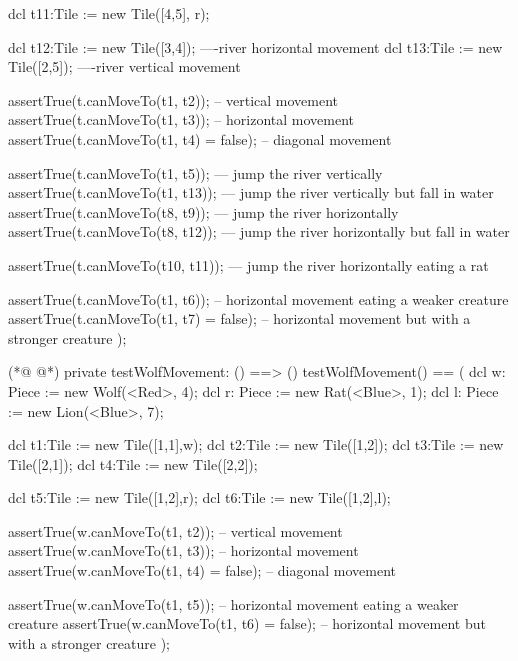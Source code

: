 \begin{vdmpp}[breaklines=true]
             dcl t11:Tile := new Tile([4,5], r);
             
             dcl t12:Tile := new Tile([3,4]); ----river horizontal movement
             dcl t13:Tile := new Tile([2,5]); ----river vertical movement
             
             
             assertTrue(t.canMoveTo(t1, t2)); -- vertical movement
             assertTrue(t.canMoveTo(t1, t3)); -- horizontal movement
             assertTrue(t.canMoveTo(t1, t4) = false); -- diagonal movement
             
             assertTrue(t.canMoveTo(t1, t5)); --- jump the river vertically
             assertTrue(t.canMoveTo(t1, t13)); --- jump the river vertically but fall in water
             assertTrue(t.canMoveTo(t8, t9)); --- jump the river horizontally
             assertTrue(t.canMoveTo(t8, t12)); --- jump the river horizontally but fall in water
             
             assertTrue(t.canMoveTo(t10, t11)); --- jump the river horizontally eating a rat
             
             assertTrue(t.canMoveTo(t1, t6)); -- horizontal movement eating a weaker creature
             assertTrue(t.canMoveTo(t1, t7) = false); -- horizontal movement but with a stronger creature
  );
  
(*@
\label{testWolfMovement:213}
@*)
          private testWolfMovement: () ==> ()
         testWolfMovement() ==
         (
                 dcl w: Piece := new Wolf(<Red>, 4);
                 dcl r: Piece := new Rat(<Blue>, 1);
                 dcl l: Piece := new Lion(<Blue>, 7);
                 
             dcl t1:Tile := new Tile([1,1],w);
             dcl t2:Tile := new Tile([1,2]);
             dcl t3:Tile := new Tile([2,1]);
             dcl t4:Tile := new Tile([2,2]);
             
             dcl t5:Tile := new Tile([1,2],r);
             dcl t6:Tile := new Tile([1,2],l);
             
             assertTrue(w.canMoveTo(t1, t2)); -- vertical movement
             assertTrue(w.canMoveTo(t1, t3)); -- horizontal movement
             assertTrue(w.canMoveTo(t1, t4) = false); -- diagonal movement
             
             assertTrue(w.canMoveTo(t1, t5)); -- horizontal movement eating a weaker creature
             assertTrue(w.canMoveTo(t1, t6) = false); -- horizontal movement but with a stronger creature
  );
  

\end{vdmpp}

